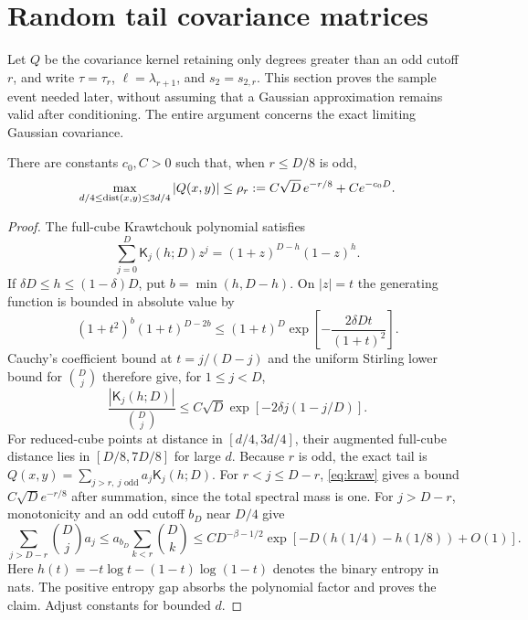 \section{Random tail covariance matrices}\label{app:gram}
Let $Q$ be the covariance kernel retaining only degrees greater than an
odd cutoff $r$, and write $\tau=\tau_r$, $\ell=\lambda_{r+1}$, and
$s_2=s_{2,r}$. This section proves the sample event needed later, without
assuming that a Gaussian approximation remains valid after conditioning.
The entire argument concerns the exact limiting Gaussian covariance.

\begin{lemma}\label{lem:far}
There are constants $c_0,C>0$ such that, when $r\le D/8$ is odd,
\[
 \max_{d/4\le\operatorname{dist}(x,y)\le3d/4}|Q(x,y)|
 \le\rho_r:=C\sqrt D\,e^{-r/8}+Ce^{-c_0D}.
\]
\end{lemma}
\begin{proof}
The full-cube Krawtchouk polynomial satisfies
\[
 \sum_{j=0}^D\mathsf K_j(h;D)z^j=(1+z)^{D-h}(1-z)^h.
\]
If $\delta D\le h\le(1-\delta)D$, put $b=\min(h,D-h)$.
On $|z|=t$ the generating function is bounded in absolute value by
\[
 (1+t^2)^b(1+t)^{D-2b}
 \le(1+t)^D\exp\!\left[-\frac{2\delta Dt}{(1+t)^2}\right].
\]
Cauchy's coefficient bound at $t=j/(D-j)$ and the uniform Stirling
lower bound for $\binom Dj$ therefore give, for $1\le j<D$,
\begin{equation}\label{eq:kraw}
 \frac{|\mathsf K_j(h;D)|}{\binom Dj}
 \le C\sqrt D\exp[-2\delta j(1-j/D)].
\end{equation}
For reduced-cube points at distance in $[d/4,3d/4]$, their augmented
full-cube distance lies in $[D/8,7D/8]$ for large $d$.
Because $r$ is odd, the exact tail is
$Q(x,y)=\sum_{j>r,\ j\text{ odd}}a_j\mathsf K_j(h;D)$.
For $r<j\le D-r$, \eqref{eq:kraw} gives a bound
$C\sqrt D e^{-r/8}$ after summation, since the total spectral mass
is one. For $j>D-r$, monotonicity and an odd cutoff $b_D$ near $D/4$
give
\[
 \sum_{j>D-r}\binom Dj a_j
 \le a_{b_D}\sum_{k<r}\binom Dk
 \le C D^{-\beta-1/2}
       \exp[-D(h(1/4)-h(1/8))+O(1)].
\]
Here $h(t)=-t\log t-(1-t)\log(1-t)$ denotes the binary entropy in nats.
The positive entropy gap absorbs the polynomial factor and proves the
claim. Adjust constants for bounded $d$.
\end{proof}


